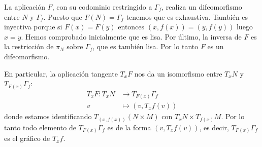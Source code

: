 \documentclass[12pt]{article}
\begin{document}
La aplicación \( F \), con su codominio restringido a \( \Gamma_f \), realiza un
difeomorfismo entre \( N \) y \( \Gamma_f \). Puesto que \( F(N) = \Gamma_f \) tenemos que es exhaustiva. También es inyectiva porque si \( F(x) =
F(y) \) entonces \( (x, f(x)) = (y, f(y)) \) luego \( x = y \). Hemos comprobado
inicialmente que es lisa. Por último, la inversa de \( F \) es la restricción de \( \pi_N
\) sobre \( \Gamma_f \), que es también lisa. Por lo tanto \( F \) es un difeomorfismo.

En particular, la aplicación tangente \( T_xF \) nos da un isomorfismo entre \( T_xN \) y
\( T_{F(x)}\Gamma_f \):
\begin{align*}
	T_x F \colon T_xN & \longrightarrow T_{F(x)} \Gamma_f \\
	v & \longmapsto (v, T_xf(v))
\end{align*}
donde estamos identificando \( T_{(x,f(x))}(N \times M) \) con \( T_x N \times T_{f(x)}M
\). Por lo tanto todo elemento de \( T_{F(x)} \Gamma_f \) es de la forma \( (v, T_xf(v))
\), es decir, \( T_{F(x)}\Gamma_f \) es el gráfico de \( T_xf \).
\end{document}
